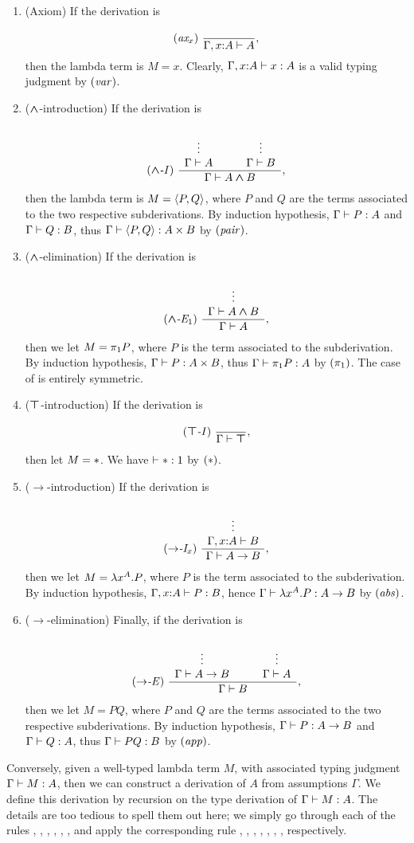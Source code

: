 \documentclass{article}
\begin{document}
\begin{enumerate}
\item (Axiom) If the derivation is
\[ \trule{ax$_x$}\ \deriv{}{\Gamma,\typ{x}{A}\tj A},
\]
then the lambda term is $M=x$. Clearly, $\Gamma,x{:}A\vdash x:A$ is
a valid typing judgment by $\textrm{(\textit{var\/})}$.
\item ($\mathbin{\textrm{\rm\boldmath $\wedge$}}$-introduction)
If the derivation is
\[ \trule{$\cand$-I}\ \deriv{\ideriv{}{\Gamma\tj A}\sep\ideriv{}{\Gamma\tj B}}{\Gamma\tj A\cand B},
\]
then the lambda term is $M=\langle P,Q\rangle$, where $P$ and $Q$ are the
terms associated to the two respective subderivations. By induction
hypothesis, $\Gamma\vdash P:A$ and $\Gamma\vdash Q:B$, thus
$\Gamma\vdash\langle P,Q\rangle:A\times B$ by $\textrm{(\textit{pair\/})}$.
\item ($\mathbin{\textrm{\rm\boldmath $\wedge$}}$-elimination)
If the derivation is
\[ \trule{$\cand$-E$_1$}\ \deriv{\ideriv{}{\Gamma\tj A\cand B}}{\Gamma\tj A},
\]
then we let $M=\pi_1 P$, where $P$ is the term associated to the
subderivation. By induction hypothesis, $\Gamma\vdash P:A\times B$, thus
$\Gamma\vdash\pi_1 P:A$ by $\textrm{(\textit{$\pi_1$\/})}$. The case of
{} is entirely symmetric.
\item ($\textrm{\rm\boldmath $\top$}$-introduction)
If the derivation is
\[ \trule{$\ctrue$-I}\ \deriv{}{\Gamma\tj\ctrue},
\]
then let $M={*}$. We have $\vdash{*}:1$ by $\textrm{(\textit{$*$\/})}$.
\item ($\to$-introduction)
If the derivation is
\[ \trule{$\to$-I$_x$}\ \deriv{\ideriv{}{\Gamma,\typ{x}{A}\tj B}}{\Gamma\tj A\to B},
\]
then we let $M=\lambda x^{A}.P$, where $P$ is the term associated to
the subderivation. By induction hypothesis, $\Gamma,x{:}A\vdash
P:B$, hence $\Gamma\vdash \lambda x^{A}.P:A\to B$ by $\textrm{(\textit{abs\/})}$.
\item ($\to$-elimination)
Finally, if the derivation is
\[ \trule{$\to$-E}\ \deriv{\ideriv{}{\Gamma\tj A\to B}\sep \ideriv{}{\Gamma\tj A}}{\Gamma\tj B},
\]
then we let $M=PQ$, where $P$ and $Q$ are the terms associated to the
two respective subderivations. By induction hypothesis, $\Gamma\vdash
P:A\to B$ and $\Gamma\vdash Q:A$, thus $\Gamma\vdash PQ: B$ by $\textrm{(\textit{app\/})}$.
\end{enumerate}

Conversely, given a well-typed lambda term $M$, with associated typing
judgment $\Gamma\vdash M:A$, then we can construct a derivation of $A$
from assumptions $\Gamma$. We define this derivation by recursion on
the type derivation of $\Gamma\vdash M:A$. The details are too tedious to
spell them out here; we simply go through each of the rules {\tjvar},
{\tjlam}, {\tjapp}, {\tjpair}, {\tjproja}, {\tjprojb}, {\tjunit} and
apply the corresponding rule {}, {},
{}, {}, {},
{}, {}, respectively.
\end{document}
